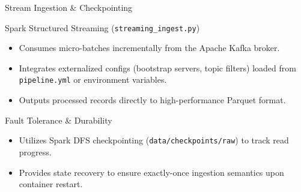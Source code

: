 \documentclass[10pt]{beamer}
\begin{document}
\begin{frame}{Stream Ingestion \& Checkpointing}
  \begin{block}{Spark Structured Streaming (\texttt{streaming\_ingest.py})}
    \begin{itemize}
      \item Consumes micro-batches incrementally from the Apache Kafka broker.
      \item Integrates externalized configs (bootstrap servers, topic filters) loaded from \texttt{pipeline.yml} or environment variables.
      \item Outputs processed records directly to high-performance Parquet format.
    \end{itemize}
  \end{block}

  \begin{exampleblock}{Fault Tolerance \& Durability}
    \begin{itemize}
      \item Utilizes Spark DFS checkpointing (\texttt{data/checkpoints/raw}) to track read progress.
      \item Provides state recovery to ensure exactly-once ingestion semantics upon container restart.
    \end{itemize}
  \end{exampleblock}
\end{frame}
\end{document}
